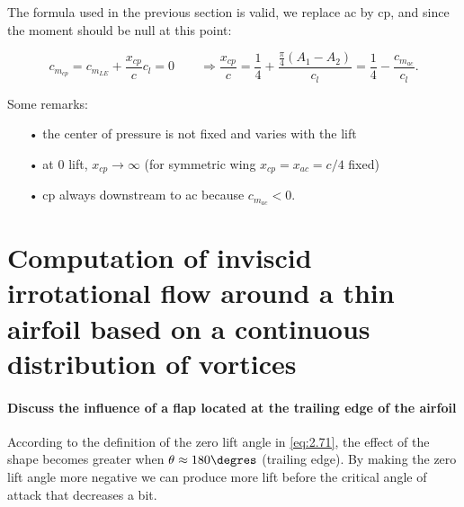 \documentclass[british,french,11pt, a4paper, openany]{article}
\begin{document}
The formula used in the previous section is valid, we replace ac by cp, and since the moment should be null at this point:

\begin{equation}
c_{m_{cp}} = c_{m_{LE}} + \frac{x_{cp}}{c} c_l = 0 \qquad \Rightarrow \frac{x_{cp}}{c} = \frac{1}{4} + \frac{\frac{\pi}{4}(A_1-A_2)}{c_l} = \frac{1}{4} - \frac{c_{m_{ac}}}{c_l}.
\end{equation}

Some remarks: 

\begin{itemize}
	\item[•] the center of pressure is not fixed and varies with the lift
	\item[•] at 0 lift, $x_{cp}\rightarrow \infty$ (for symmetric wing $x_{cp} = x_{ac} = c/4$ fixed)
	\item[•] cp always downstream to ac because $c_{m_{ac}}<0$.
\end{itemize}



\section{Computation of inviscid irrotational flow around a thin airfoil based on a
	continuous distribution of vortices}
\paragraph{Discuss the influence of a flap located at the trailing edge of the airfoil}
	According to the definition of the zero lift angle in \eqref{eq:2.71}, the effect of the shape becomes greater when $\theta \approx 180\degres$ (trailing edge). By making the zero lift angle more negative we can produce more lift before the critical angle of attack that decreases a bit.
	
\end{document}
